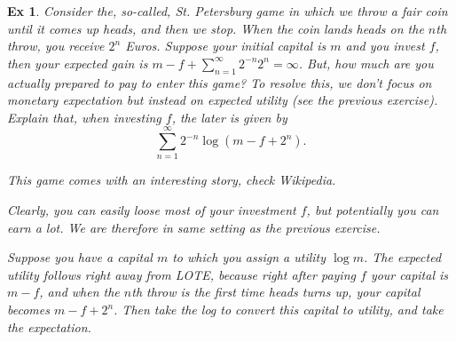 \documentclass[a4paper,11pt]{article}
\newtheorem{exercise}[theorem]{Ex}
\begin{document}
\begin{exercise}
Consider the, so-called, St.
Petersburg game in which we throw a fair coin until it comes up heads, and then we stop.
When the coin lands heads on the $n$th throw, you receive $2^{n}$ Euros.
Suppose your initial capital is $m$ and you invest $f$, then your expected gain is $m-f + \sum_{n=1}^{\infty} 2^{-n} 2^{n} = \infty$.
But, how much are you actually prepared to pay to enter this game?
To resolve this, we don't focus on monetary expectation but instead on expected utility (see the previous exercise).
Explain that, when investing $f$, the later is given by
\begin{equation}
  \label{eq:135}
  \sum_{n=1}^{\infty} 2^{-n}\log(m - f + 2^{n}).
\end{equation}
\begin{solution}
This game comes with an interesting story,  check Wikipedia.

Clearly, you can easily loose most of your investment $f$, but potentially you can earn a lot. We are therefore in same setting as the previous exercise.

Suppose you have a capital $m$ to which you assign a utility $\log m$.
The expected utility follows right away from LOTE,
because right after paying $f$ your capital is $m-f$, and when the $n$th throw is the first time heads turns up, your capital becomes $m-f+2^{n}$.
Then take the log to convert this capital to utility, and take the expectation.
\end{solution}
\end{exercise}
\end{document}
